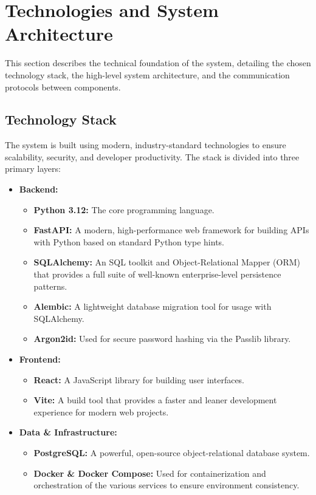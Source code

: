 \section{Technologies and System Architecture}

This section describes the technical foundation of the \projectTitle{} system, detailing the chosen technology stack, the high-level system architecture, and the communication protocols between components.

\subsection{Technology Stack}

The system is built using modern, industry-standard technologies to ensure scalability, security, and developer productivity. The stack is divided into three primary layers:

\begin{itemize}
    \item \textbf{Backend:} 
    \begin{itemize}
        \item \textbf{Python 3.12:} The core programming language.
        \item \textbf{FastAPI:} A modern, high-performance web framework for building APIs with Python based on standard Python type hints.
        \item \textbf{SQLAlchemy:} An SQL toolkit and Object-Relational Mapper (ORM) that provides a full suite of well-known enterprise-level persistence patterns.
        \item \textbf{Alembic:} A lightweight database migration tool for usage with SQLAlchemy.
        \item \textbf{Argon2id:} Used for secure password hashing via the Passlib library.
    \end{itemize}
    
    \item \textbf{Frontend:}
    \begin{itemize}
        \item \textbf{React:} A JavaScript library for building user interfaces.
        \item \textbf{Vite:} A build tool that provides a faster and leaner development experience for modern web projects.
    \end{itemize}

    \item \textbf{Data \& Infrastructure:}
    \begin{itemize}
        \item \textbf{PostgreSQL:} A powerful, open-source object-relational database system.
        \item \textbf{Docker \& Docker Compose:} Used for containerization and orchestration of the various services to ensure environment consistency.
    \end{itemize}
\end{itemize}

